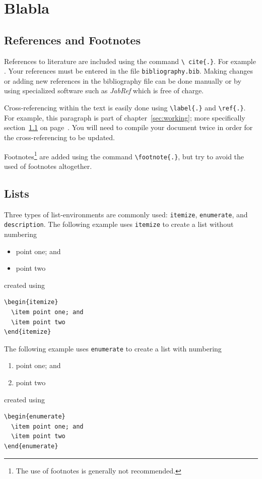 \chapter{Blabla}\label{sec:blabla}

\section{References and Footnotes}\label{sec:references}
References to literature are included using the command \texttt{\textbackslash
cite\{.\}}. For example \cite{optreg,motsys}. Your references must be entered in the file \texttt{bibliography.bib}. Making changes or adding new references in the bibliography file can be done manually or by using specialized software such as \textit{JabRef} which is free of charge.
 
Cross-referencing within the text is easily done using \texttt{\textbackslash label\{.\}} and \texttt{\textbackslash ref\{.\}}. For example, this paragraph is part of chapter~\ref{sec:working}; more specifically section~\ref{sec:references} on page~\pageref{sec:references}. You will need to compile your document twice in order for the cross-referencing to be updated.

Footnotes\footnote{The use of footnotes is generally not recommended.} are added using the command \texttt{\textbackslash footnote\{.\}}, but try to avoid the used of footnotes altogether.

\section{Lists}\label{sec:lists}
Three types of list-environments are commonly used: \texttt{itemize}, \texttt{enumerate}, and \texttt{description}. The following example uses \texttt{itemize} to create a list without numbering
\begin{itemize}
  \item point one; and
  \item point two
\end{itemize}
created using
\begin{verbatim}
\begin{itemize}
  \item point one; and
  \item point two
\end{itemize}
\end{verbatim}

The following example uses \texttt{enumerate} to create a list with numbering
\begin{enumerate}
  \item point one; and
  \item point two
\end{enumerate}
created using
\begin{verbatim}
\begin{enumerate}
  \item point one; and
  \item point two
\end{enumerate}
\end{verbatim}

